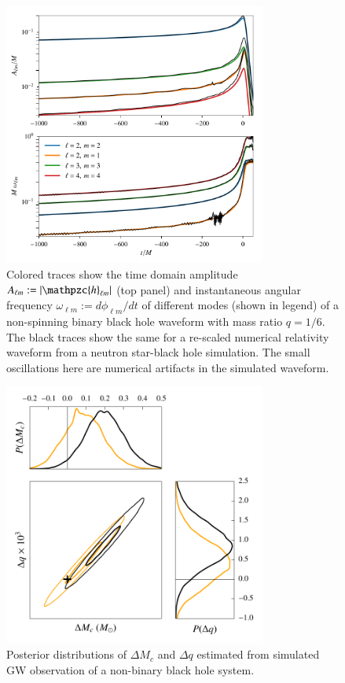 \documentclass[prd,preprintnumbers,twocolumn,eqsecnum,floatfix,a4paper,nofootinbib,superscriptaddress]{revtex4}
\newcommand{\hlm}{\mathpzc{h}_{\ell m}}
\begin{document}
\begin{figure}[htb] 
\begin{center}
\includegraphics[width=3.4in]{figs/BBH_NSBH_waveforms.pdf}
\end{center} 
\caption{Colored traces show the time domain amplitude $A_{\ell m} := |\hlm|$ (top panel) and instantaneous angular frequency $\omega_{\ell m} := d\phi_{\ell m}/dt$ of different modes (shown in legend) of a non-spinning binary black hole waveform with mass ratio $q = 1/6$. The black traces show the same for a re-scaled numerical relativity waveform from a neutron star-black hole simulation. The small oscillations here are numerical artifacts in the simulated waveform.}
\label{fig:bbh_nsbh_waveforms}
\end{figure}

\begin{figure}[htb] 
\begin{center}
\includegraphics[width=3.4in]{figs/posteriors_BBH_rescaled_NSBH.pdf}
\end{center} 
\caption{Posterior distributions of $\Delta M_c$ and $\Delta q$ estimated from simulated GW observation of a non-binary black hole system.} 
\label{fig:non_bbh_posterior}
\end{figure}
\end{document}
